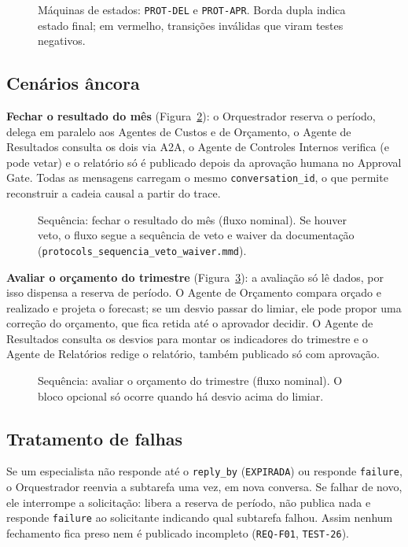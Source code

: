 \documentclass[10pt,a4paper]{article}
\newcommand{\code}[1]{\texttt{\small #1}}
\begin{document}
\begin{figure}[!htbp]
  \centering
  \resizebox{\linewidth}{!}{}
  \caption{Máquinas de estados: \code{PROT-DEL} e \code{PROT-APR}. Borda dupla indica estado final; em vermelho, transições inválidas que viram testes negativos.}
  \label{fig:fsm}
\end{figure}

\subsection{Cenários âncora}
\textbf{Fechar o resultado do mês} (Figura~\ref{fig:seq}): o Orquestrador reserva o período, delega em paralelo aos
Agentes de Custos e de Orçamento, o Agente de Resultados consulta os dois via A2A, o Agente de Controles Internos
verifica (e pode vetar) e o relatório só é publicado depois da aprovação humana no Approval Gate. Todas as mensagens
carregam o mesmo \code{conversation\_id}, o que permite reconstruir a cadeia causal a partir do trace.

\begin{figure}[!htbp]
  \centering
  \resizebox{\linewidth}{!}{}
  \caption{Sequência: fechar o resultado do mês (fluxo nominal). Se houver veto, o fluxo segue a sequência de veto e waiver da documentação (\texttt{protocols\_sequencia\_veto\_waiver.mmd}).}
  \label{fig:seq}
\end{figure}

\textbf{Avaliar o orçamento do trimestre} (Figura~\ref{fig:seq-orc}): a avaliação só lê dados, por isso dispensa a
reserva de período. O Agente de Orçamento compara orçado e realizado e projeta o forecast; se um desvio passar do
limiar, ele pode propor uma correção do orçamento, que fica retida até o aprovador decidir. O Agente de Resultados
consulta os desvios para montar os indicadores do trimestre e o Agente de Relatórios redige o relatório, também
publicado só com aprovação.

\begin{figure}[!htbp]
  \centering
  \resizebox{\linewidth}{!}{}
  \caption{Sequência: avaliar o orçamento do trimestre (fluxo nominal). O bloco opcional só ocorre quando há desvio acima do limiar.}
  \label{fig:seq-orc}
\end{figure}

\subsection{Tratamento de falhas}
Se um especialista não responde até o \code{reply\_by} (\texttt{EXPIRADA}) ou responde \texttt{failure}, o
Orquestrador reenvia a subtarefa uma vez, em nova conversa. Se falhar de novo, ele interrompe a solicitação:
libera a reserva de período, não publica nada e responde \texttt{failure} ao solicitante indicando qual subtarefa
falhou. Assim nenhum fechamento fica preso nem é publicado incompleto (\code{REQ-F01}, \code{TEST-26}).
\end{document}
